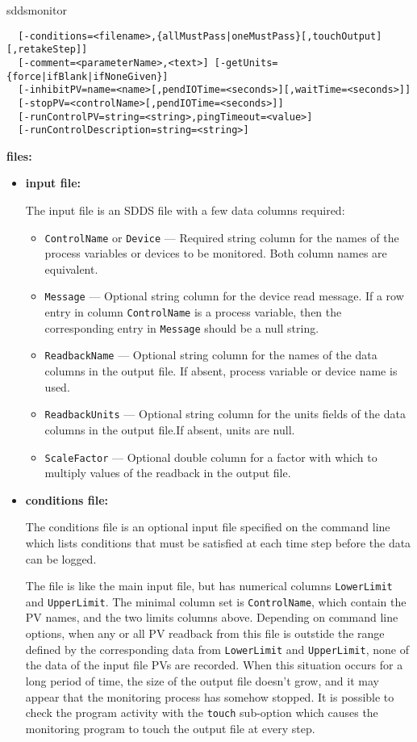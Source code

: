 \begin{sddsprog}{sddsmonitor}
\begin{verbatim}
  [-conditions=<filename>,{allMustPass|oneMustPass}[,touchOutput][,retakeStep]]
  [-comment=<parameterName>,<text>] [-getUnits={force|ifBlank|ifNoneGiven}]
  [-inhibitPV=name=<name>[,pendIOTime=<seconds>][,waitTime=<seconds>]]
  [-stopPV=<controlName>[,pendIOTime=<seconds>]]
  [-runControlPV=string=<string>,pingTimeout=<value>]
  [-runControlDescription=string=<string>]
\end{verbatim}
\item \textbf{files:}
\begin{itemize}
  \item \textbf{input file:}\par
The input file is an SDDS file with a few data columns required:
  \begin{itemize}
    \item {\tt ControlName} or {\tt Device} --- Required string column for the names of the process variables
                or devices to be monitored. Both column names are equivalent.
    \item {\tt Message} --- Optional string column for the device read message. If a row entry in
                column {\tt ControlName} is a process variable, then the corresponding entry
                in {\tt Message} should be a null string.
    \item {\tt ReadbackName} --- Optional string column for the names of the data columns in the
                output file. If absent, process variable or device name is used.
    \item {\tt ReadbackUnits} --- Optional string column for the units fields of the data columns in the
                output file.If absent, units are null.
    \item {\tt ScaleFactor} --- Optional double column for a factor with which to multiply
                values of the readback in the output file.
  \end{itemize}

  \item \textbf{conditions file:} \par
The conditions file is an optional input file specified on the command line which lists
conditions that must be satisfied at each time step before the data can be logged.

The file is like the main input file, but has numerical columns \verb+LowerLimit+ and \verb+UpperLimit+.
The minimal column set is \verb+ControlName+, which contain the PV names, and the two limits columns above.
Depending on command line options, when any or all PV readback from this file
is outstide the range defined by the corresponding data from \verb+LowerLimit+ and \verb+UpperLimit+,
none of the data of the input file PVs are recorded.
When this situation occurs for a long period of time, the size of the output file doesn't
grow, and it may appear that the monitoring process has somehow stopped.
It is possible to check the program activity with the \verb+touch+ sub-option
which causes the monitoring program to touch the output file at every step.


\end{itemize}
\end{sddsprog}
